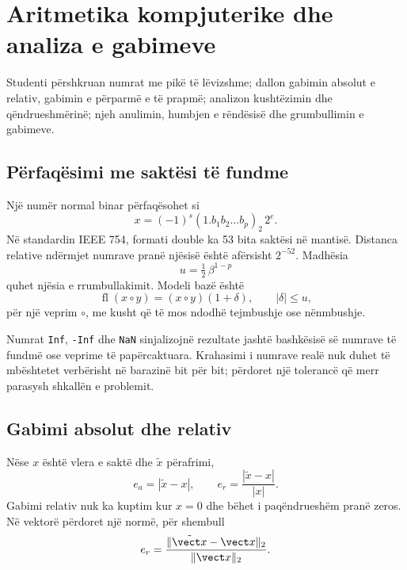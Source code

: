 \chapter{Aritmetika kompjuterike dhe analiza e gabimeve}
\begin{qellime}
Studenti përshkruan numrat me pikë të lëvizshme; dallon gabimin absolut e relativ, gabimin e përparmë e të prapmë; analizon kushtëzimin dhe qëndrueshmërinë; njeh anulimin, humbjen e rëndësisë dhe grumbullimin e gabimeve.
\end{qellime}

\section{Përfaqësimi me saktësi të fundme}
Një numër normal binar përfaqësohet si
\begin{equation}
 x=(-1)^s(1.b_1b_2\ldots b_p)_2\,2^e.
\end{equation}
Në standardin IEEE 754, formati double ka 53 bita saktësi në mantisë. Distanca relative ndërmjet numrave pranë njësisë është afërsisht $2^{-52}$. Madhësia
\begin{equation}
 u=\tfrac12\,\beta^{1-p}
\end{equation}
quhet njësia e rrumbullakimit. Modeli bazë është
\begin{equation}
 \operatorname{fl}(x\circ y)=(x\circ y)(1+\delta),\qquad |\delta|\le u,
\end{equation}
për një veprim $\circ$, me kusht që të mos ndodhë tejmbushje ose nënmbushje.

Numrat \texttt{Inf}, \texttt{-Inf} dhe \texttt{NaN} sinjalizojnë rezultate jashtë bashkësisë së numrave të fundmë ose veprime të papërcaktuara. Krahasimi i numrave realë nuk duhet të mbështetet verbërisht në barazinë bit për bit; përdoret një tolerancë që merr parasysh shkallën e problemit.

\section{Gabimi absolut dhe relativ}
Nëse $x$ është vlera e saktë dhe $\tilde x$ përafrimi,
\begin{equation}
 e_a=|\tilde x-x|,\qquad e_r=\frac{|\tilde x-x|}{|x|}.
\end{equation}
Gabimi relativ nuk ka kuptim kur $x=0$ dhe bëhet i paqëndrueshëm pranë zeros. Në vektorë përdoret një normë, për shembull
\begin{equation}
 e_r=\frac{\|\tilde{\vect x}-\vect x\|_2}{\|\vect x\|_2}.
\end{equation}

